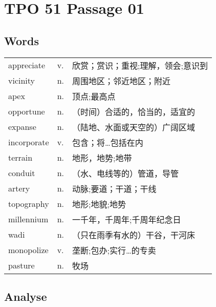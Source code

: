 \section{TPO 51 Passage 01}

\subsection{Words}

\begin{tabular}{lll}
    appreciate  & v. & 欣赏；赏识；重视;理解，领会;意识到 \\
    vicinity    & n. & 周围地区；邻近地区；附近       \\
    apex        & n. & 顶点;最高点             \\
    opportune   & n. & （时间）合适的，恰当的，适宜的    \\
    expanse     & n. & （陆地、水面或天空的）广阔区域    \\
    incorporate & v. & 包含；将…包括在内          \\
    terrain     & n. & 地形，地势;地带           \\
    conduit     & n. & （水、电线等的）管道，导管      \\
    artery      & n. & 动脉;要道；干道；干线        \\
    topography  & n. & 地形;地貌;地势           \\
    millennium  & n. & 一千年，千周年;千周年纪念日     \\
    wadi        & n. & （只在雨季有水的）干谷，干河床    \\
    monopolize  & v. & 垄断;包办;实行…的专卖       \\
    pasture     & n. & 牧场                 \\
\end{tabular}

\subsection{Analyse}


